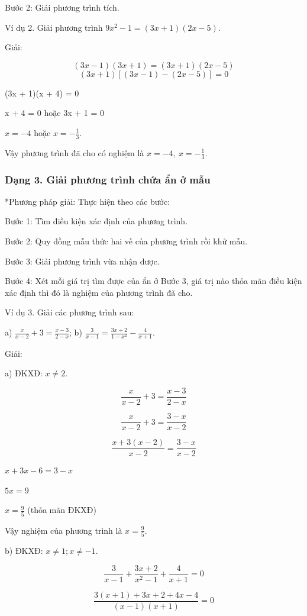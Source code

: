 \documentclass[%
    fontsize=12pt,%
    chapterprefix=false,%
    open=right,%
    twoside=false,%
    numbers=noenddot,%
    headings=optiontohead,%
    final,%
    DIV=15,%
    parskip=half %
]{scrbook}
\begin{document}
Bước 2: Giải phương trình tích.

Ví dụ 2. Giải phương trình $9x^2 - 1 = (3x + 1)(2x - 5)$.

Giải:

    \[(3x - 1)(3x + 1) = (3x + 1)(2x - 5)\]
    \[(3x + 1)[(3x - 1) - (2x - 5)] = 0\]


(3x + 1)(x + 4) = 0

x + 4 = 0 hoặc 3x + 1 = 0

$x = -4$ hoặc $x = -\frac{1}{3}$.

Vậy phương trình đã cho có nghiệm là $ x = -4,\ x = -\frac{1}{3} $.
\subsubsection{Dạng 3. Giải phương trình chứa ẩn ở mẫu}

*Phương pháp giải: Thực hiện theo các bước:

Bước 1: Tìm điều kiện xác định của phương trình.

Bước 2: Quy đồng mẫu thức hai vế của phương trình rồi khử mẫu.

Bước 3: Giải phương trình vừa nhận được.

Bước 4: Xét mỗi giá trị tìm được của ẩn ở Bước 3, giá trị nào thỏa mãn điều kiện xác định thì đó là nghiệm của phương trình đã cho.

Ví dụ 3. Giải các phương trình sau:

a) $\frac{x}{x-2} + 3 = \frac{x-3}{2-x}$; \hspace{2cm} b) $\frac{3}{x-1} = \frac{3x+2}{1-x^2} - \frac{4}{x+1}$.

Giải:

a) ĐKXĐ: $x \neq 2$.

\[
\frac{x}{x-2} + 3 = \frac{x-3}{2-x}
\]

\[
\frac{x}{x-2} + 3 = \frac{3-x}{x-2}
\]

\[
\frac{x + 3(x-2)}{x-2} = \frac{3-x}{x-2}
\]

$x + 3x - 6 = 3 - x$

$5x = 9$

$x = \frac{9}{5}$ (thỏa mãn ĐKXĐ)

Vậy nghiệm của phương trình là $x = \frac{9}{5}$.

b) ĐKXĐ: $x \neq 1; x \neq -1$.

\[
\frac{3}{x-1} + \frac{3x+2}{x^2-1} + \frac{4}{x+1} = 0
\]

\[
\frac{3(x+1) + 3x + 2 + 4x - 4}{(x-1)(x+1)} = 0
\]
\end{document}
